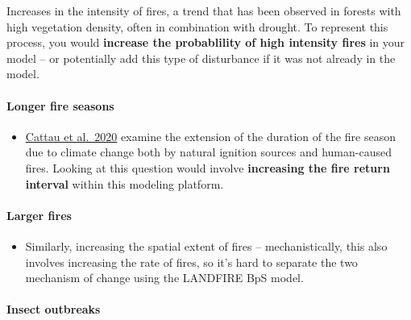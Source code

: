 \documentclass[
]{article}
\providecommand{\tightlist}{%
  \setlength{\itemsep}{0pt}\setlength{\parskip}{0pt}}
\begin{document}
Increases in the intensity of fires, a trend that has been observed in
forests with high vegetation density, often in combination with drought.
To represent this process, you would \textbf{increase the probablility
of high intensity fires} in your model -- or potentially add this type
of disturbance if it was not already in the model.

\hypertarget{longer-fire-seasons}{%
\paragraph{Longer fire seasons}\label{longer-fire-seasons}}

\begin{itemize}
\tightlist
\item
  \href{https://doi.org/10.1111/geb.13058}{Cattau et al.~2020} examine
  the extension of the duration of the fire season due to climate change
  both by natural ignition sources and human-caused fires. Looking at
  this question would involve \textbf{increasing the fire return
  interval} within this modeling platform.
\end{itemize}

\hypertarget{larger-fires}{%
\paragraph{Larger fires}\label{larger-fires}}

\begin{itemize}
\tightlist
\item
  Similarly, increasing the spatial extent of fires -- mechanistically,
  this also involves increasing the rate of fires, so it's hard to
  separate the two mechanism of change using the LANDFIRE BpS model.
\end{itemize}

\hypertarget{insect-outbreaks}{%
\paragraph{Insect outbreaks}\label{insect-outbreaks}}
\end{document}

